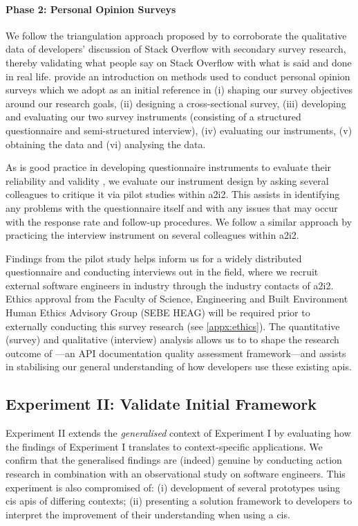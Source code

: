 \paragraph{Phase 2: Personal Opinion Surveys}
We follow the triangulation approach proposed by \citet{Jick:1979el} to corroborate the qualitative data of developers' discussion of Stack Overflow with secondary survey research, thereby validating what people say on Stack Overflow with what is said and done in real life. \citet{Kitchenham:2007ux} provide an introduction on methods used to conduct personal opinion surveys which we adopt as an initial reference in (i) shaping our survey objectives around our research goals, (ii) designing a cross-sectional survey, (iii) developing and evaluating our two survey instruments (consisting of a structured questionnaire and semi-structured interview), (iv) evaluating our instruments, (v) obtaining the data and (vi) analysing the data.

As is good practice in developing questionnaire instruments to evaluate their reliability and validity \citep{Litwin:1995wt}, we evaluate our instrument design by asking several colleagues to critique it via pilot studies within \gls{a2i2}. This assists in identifying any problems with the questionnaire itself and with any issues that may occur with the response rate and follow-up procedures. We follow a similar approach by practicing the interview instrument on several colleagues within \gls{a2i2}.

Findings from the pilot study helps inform us for a widely distributed questionnaire and conducting interviews out in the field, where we recruit external software engineers in industry through the industry contacts of \gls{a2i2}. Ethics approval from the Faculty of Science, Engineering and Built Environment Human Ethics Advisory Group (SEBE HEAG) will be required prior to externally conducting this survey research (see \cref{appx:ethics}). The quantitative (survey) and qualitative (interview) analysis allows us to to shape the research outcome of ---an API documentation quality assessment framework---and assists in stabilising our general understanding of how developers use these existing \glspl{api}.

\subsection{Experiment II: Validate Initial Framework}
\label{ssec:research-methodology:experiments:2}

Experiment II extends the \textit{generalised} context of Experiment I by evaluating how the findings of Experiment I translates to context-specific applications. We confirm that the generalised findings are (indeed) genuine by conducting action research in combination with an observational study on software engineers. This experiment is also compromised of: (i) development of several prototypes using \gls{cis} \glspl{api} of differing contexts; (ii) presenting a solution framework to developers to interpret the improvement of their understanding when using a \gls{cis}.

